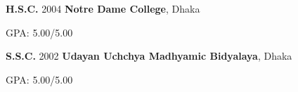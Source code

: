 \documentclass[cvauthor={Dr. Sajid Muhaimin Choudhury}]{buetcv}
\begin{document}
        \begin{threecolentry}{\textbf{H.S.C.}}{
            2004
        }
            \textbf{Notre Dame College}, Dhaka 
            \begin{highlights}
                \item GPA: 5.00/5.00 
            \end{highlights}
        \end{threecolentry}
        \begin{threecolentry}{\textbf{S.S.C.}}{
            2002
        }
            \textbf{Udayan Uchchya Madhyamic Bidyalaya}, Dhaka 
            \begin{highlights}
                \item GPA: 5.00/5.00 
            \end{highlights}
        \end{threecolentry}        
\end{document}
